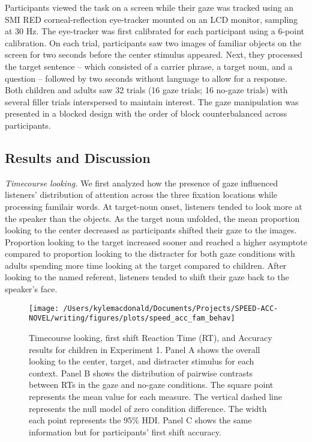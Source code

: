 \documentclass[man,floatsintext]{apa6}
\begin{document}
Participants viewed the task on a screen while their gaze was tracked
using an SMI RED corneal-reflection eye-tracker mounted on an LCD
monitor, sampling at 30 Hz. The eye-tracker was first calibrated for
each participant using a 6-point calibration. On each trial,
participants saw two images of familiar objects on the screen for two
seconds before the center stimulus appeared. Next, they processed the
target sentence -- which consisted of a carrier phrase, a target noun,
and a question -- followed by two seconds without language to allow for
a response. Both children and adults saw 32 trials (16 gaze trials; 16
no-gaze trials) with several filler trials interspersed to maintain
interest. The gaze manipulation was presented in a blocked design with
the order of block counterbalanced across participants.

\subsection{Results and Discussion}\label{results-and-discussion}

\emph{Timecourse looking.} We first analyzed how the presence of gaze
influenced listeners' distribution of attention across the three
fixation locations while processing familair words. At target-noun
onset, listeners tended to look more at the speaker than the objects. As
the target noun unfolded, the mean proportion looking to the center
decreased as participants shifted their gaze to the images. Proportion
looking to the target increased sooner and reached a higher asymptote
compared to proportion looking to the distracter for both gaze
conditions with adults spending more time looking at the target compared
to children. After looking to the named referent, listeners tended to
shift their gaze back to the speaker's face.

\begin{figure}[!t]

{\centering \texttt{[image: /Users/kylemacdonald/Documents/Projects/SPEED-ACC-NOVEL/writing/figures/plots/speed\_acc\_fam\_behav]} 

}

\caption{Timecourse looking, first shift Reaction Time (RT), and Accuracy results for children in Experiment 1. Panel A shows the overall looking to the center, target, and distracter stimulus for each context. Panel B shows the distribution of pairwise contrasts between RTs in the gaze and no-gaze conditions. The square point represents the mean value for each measure. The vertical dashed line represents the null model of zero condition difference. The width each point represents the 95\% HDI. Panel C shows the same information but for participants' first shift accuracy.}\label{fig:speed-acc-gaze-results}
\end{figure}
\end{document}
